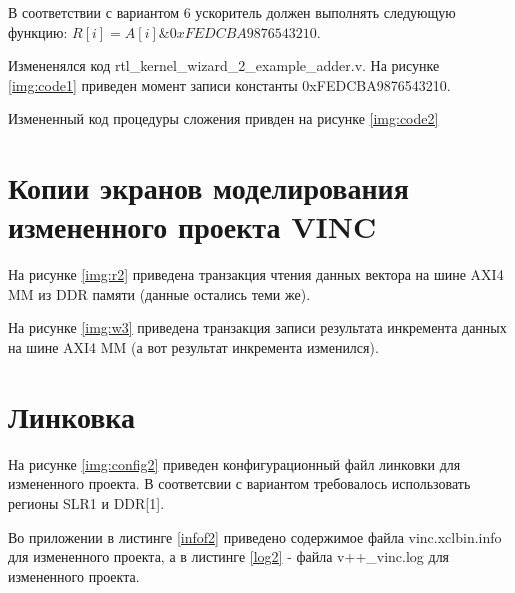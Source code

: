 В соответствии с вариантом 6 ускоритель должен выполнять следующую функцию: $R[i] = A[i] \& 0xFEDCBA9876543210$.

Измененялся код rtl\_kernel\_wizard\_2\_example\_adder.v. На рисунке \ref{img:code1} приведен момент записи константы 0xFEDCBA9876543210.


Измененный код процедуры сложения привден на рисунке \ref{img:code2}


\section{Копии экранов моделирования измененного проекта VINC}

На рисунке \ref{img:r2} приведена транзакция чтения данных вектора на шине AXI4 MM из DDR памяти (данные остались теми же).


На рисунке \ref{img:w3} приведена транзакция записи результата инкремента данных на шине AXI4 MM (а вот результат инкремента изменился).



\section{Линковка}

На рисунке \ref{img:config2} приведен конфигурационный файл линковки для измененного проекта. В соответсвии  с вариантом требовалось использовать регионы SLR1 и DDR[1].




Во приложении в листинге \ref{infof2} приведено содержимое файла vinc.xclbin.info для измененного проекта, а в листинге \ref{log2} - файла v++\_vinc.log для измененного проекта.





